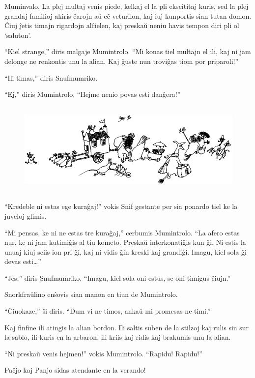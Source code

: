 Muminvalo. La plej multaj venis piede, kelkaj el la pli ekscititaj kuris, sed la plej grandaj familioj akiris ĉarojn aŭ eĉ veturilon, kaj iuj kunportis sian tutan domon. Ĉiuj ĵetis timajn rigardojn alĉielen, kaj preskaŭ neniu havis tempon diri pli ol `saluton'.

``Kiel strange,'' diris malgaje Mumintrolo. ``Mi konas tiel multajn el ili, kaj ni jam delonge ne renkontis unu la alian. Kaj ĝuste nun troviĝas tiom por priparoli!''

``Ili timas,'' diris Snufmumriko.

``Ej,'' diris Mumintrolo. ``Hejme nenio povas esti danĝera!''

\begin{figure}[htbp]
\centering
\includegraphics[width=400pt,height=132pt]{8-2.png}
\caption{}
\label{8-2}
\end{figure}

``Kredeble ni estas ege kuraĝaj!'' vokis Snif gestante per sia ponardo tiel ke la juveloj glimis.

``Mi pensas, ke ni ne estas tre kuraĝaj,'' cerbumis Mumintrolo. ``La afero estas nur, ke ni jam kutimiĝis al tiu kometo. Preskaŭ interkonatiĝis kun ĝi. Ni estis la unuaj kiuj sciis ion pri ĝi, kaj ni vidis ĝin kreski kaj grandiĝi. Imagu, kiel sola ĝi devas esti{\ldots}''

``Jes,'' diris Snufmumriko. ``Imagu, kiel sola oni estus, se oni timigus ĉiujn.''

Snorkfraŭlino enŝovis sian manon en tiun de Mumintrolo.

``Ĉiuokaze,'' ŝi diris. ``Dum vi ne timos, ankaŭ mi promesas ne timi.''

\sectionbreak

Kaj finfine ili atingis la alian bordon. Ili saltis suben de la stilzoj kaj rulis sin sur la sablo, ili kuris en la arbaron, ili kriis kaj ridis kaj brakumis unu la alian.

``Ni preskaŭ venis hejmen!'' vokis Mumintrolo. ``Rapidu! Rapidu!''

Paĉjo kaj Panjo sidas atendante en la verando!

